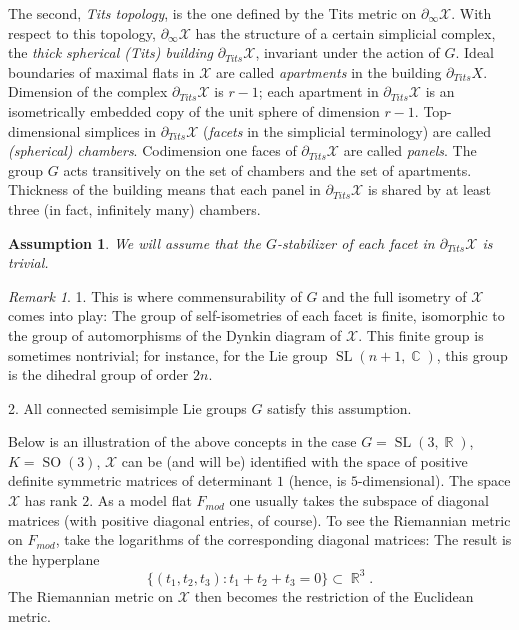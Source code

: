 \documentclass[12pt]{amsbook}%
\newtheorem{assumption}{Assumption}[chapter]
\theoremstyle{definition}
\theoremstyle{remark}
\newtheorem{rem}[thm]{Remark}
\numberwithin{section}{chapter}
\numberwithin{subsection}{section}
\numberwithin{figure}{chapter}
\DeclareMathOperator{\C}{\mathbb{C}}
\DeclareMathOperator{\SL}{SL}
\DeclareMathOperator{\SO}{SO}
\DeclareMathOperator{\R}{\mathbb{R}}
\def\tits{\partial_{Tits}}
\def\Fmod{F_{mod}}
\def\cX{{\mathscr{X}}}
\def\geo{\partial_\infty}
\begin{document}
{{ The second, {\em Tits topology}, 
  is the one defined by the Tits metric on $\geo \cX$. With respect to this topology,  $\geo \cX$ has the structure of a certain simplicial complex, the {\em thick spherical (Tits) building} $\tits \cX$, invariant under the action of $G$. Ideal boundaries of maximal flats in $\cX$ are called {\em apartments} in the building $\tits X$. 
  Dimension of the complex $\tits \cX$ is $r-1$; each apartment in $\tits \cX$ is an isometrically embedded copy of the unit sphere of dimension $r-1$.   Top-dimensional simplices in $\tits \cX$ ({\em facets} in the simplicial terminology)  are called {\em (spherical) chambers}. Codimension one faces of $\tits \cX$ are called  {\em panels}. 
  The group $G$ acts transitively on the set of chambers and the set of apartments.     
  Thickness of the building means that each  panel 
  in $\tits \cX$ is shared by at least three (in fact, infinitely many) chambers. 


  
\begin{assumption}
We will assume that the $G$-stabilizer of each facet in $\tits \cX$ is trivial. 
\end{assumption}  
  
\begin{rem}
1. This is where commensurability of $G$ and the full isometry of $\cX$ comes into play: The group of self-isometries of each facet is finite, isomorphic to the group of automorphisms of the Dynkin diagram of $\cX$. This finite group is sometimes nontrivial; for instance, for the Lie group $\SL(n+1, \C)$, this group is the dihedral group of order $2n$. 

2. All connected semisimple Lie groups $G$ satisfy this assumption. 
\end{rem}  
  
  
  Below is an illustration of the above concepts in the case $G=\SL(3,\R)$, $K=\SO(3)$, $\cX$ can be (and will be) identified with the space of positive definite symmetric matrices of determinant $1$ (hence, is $5$-dimensional). The space $\cX$ has rank $2$. As a model flat $\Fmod$ one usually takes the subspace of diagonal matrices (with positive diagonal entries, of course). To see the Riemannian metric on $\Fmod$, take the logarithms of the corresponding diagonal matrices: The result is the hyperplane
$$
\{(t_1, t_2, t_3): t_1+t_2+t_3=0\}\subset \R^3. 
$$
The Riemannian metric on $\cX$ then becomes the restriction of the Euclidean metric. 


}}
\end{document}
